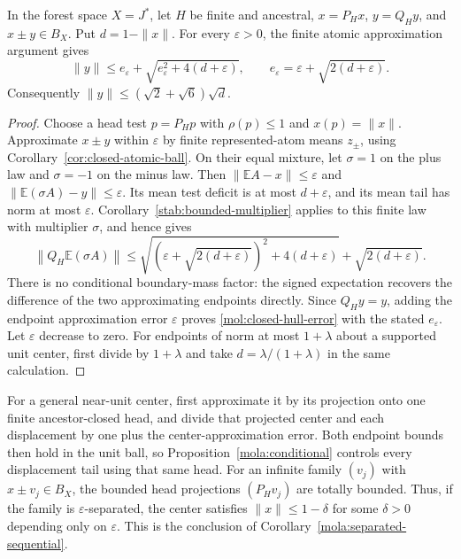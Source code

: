 \begin{proposition}\label{mol:closed-hull-signed}
In the forest space $X=J^*$, let $H$ be finite and ancestral,
$x=P_Hx$, $y=Q_Hy$, and $x\pm y\in B_X$. Put $d=1-\|x\|$.
For every $\varepsilon>0$, the finite atomic approximation argument gives
\begin{equation}\label{mol:closed-hull-error}
 \|y\|\le e_\varepsilon+
 \sqrt{e_\varepsilon^2+4(d+\varepsilon)},\qquad
 e_\varepsilon=\varepsilon+\sqrt{2(d+\varepsilon)}.
\end{equation}
Consequently $\|y\|\le(\sqrt2+\sqrt6)\sqrt d$.
\end{proposition}

\begin{proof}
Choose a head test $p=P_Hp$ with $\rho(p)\le1$ and
$x(p)=\|x\|$. Approximate $x\pm y$ within $\varepsilon$ by
finite represented-atom means $z_\pm$, using
Corollary~\ref{cor:closed-atomic-ball}. On their equal mixture, let
$\sigma=1$ on the plus law and $\sigma=-1$ on the minus law.
Then $\|\mathbb EA-x\|\le\varepsilon$ and
$\|\mathbb E(\sigma A)-y\|\le\varepsilon$.
Its mean test deficit is at most $d+\varepsilon$, and its mean
tail has norm at most $\varepsilon$. Corollary~\ref{stab:bounded-multiplier}
applies to this finite law with multiplier $\sigma$, and hence gives
\[
 \left\|Q_H\mathbb E(\sigma A)\right\|
 \le\sqrt{(\varepsilon+\sqrt{2(d+\varepsilon)})^2
                   +4(d+\varepsilon)}
       +\sqrt{2(d+\varepsilon)}.
\]
There is no conditional boundary-mass factor: the signed expectation
recovers the difference of the two approximating endpoints directly.
Since $Q_Hy=y$, adding the endpoint approximation error
$\varepsilon$ proves \eqref{mol:closed-hull-error} with the stated
$e_\varepsilon$.
Let $\varepsilon$ decrease to zero. For endpoints of norm at most
$1+\lambda$ about a supported unit center, first divide by
$1+\lambda$ and take $d=\lambda/(1+\lambda)$ in the same calculation.
\end{proof}

For a general near-unit center, first approximate it by its projection
onto one finite ancestor-closed head, and divide that projected center
and each displacement by one plus the center-approximation error.
Both endpoint bounds then hold in the unit ball, so
Proposition~\ref{mola:conditional} controls every displacement tail
using that same head. For an infinite family $(v_j)$ with
$x\pm v_j\in B_X$, the bounded head projections $(P_Hv_j)$ are
totally bounded. Thus, if the family is $\varepsilon$-separated,
the center satisfies $\|x\|\le1-\delta$ for some $\delta>0$
depending only on $\varepsilon$. This is the conclusion of
Corollary~\ref{mola:separated-sequential}.


